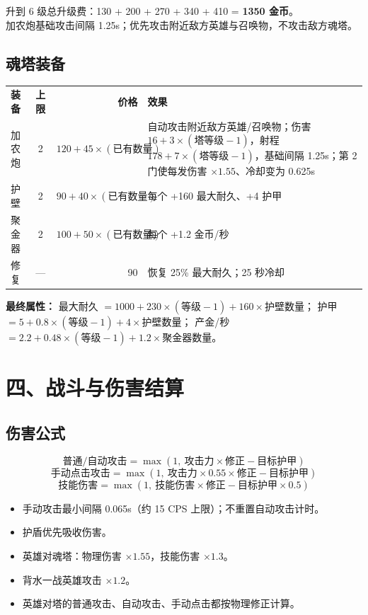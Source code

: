 \documentclass{ctexart}
\begin{document}
\vspace{2pt}
{\footnotesize
升到 6 级总升级费：130 + 200 + 270 + 340 + 410 = \textbf{1350 金币}。\\
加农炮基础攻击间隔 1.25s；优先攻击附近敌方英雄与召唤物，不攻击敌方魂塔。
}

\subsection*{魂塔装备}

{\footnotesize
\begin{tabularx}{\textwidth}{@{}l c r X@{}}
\rowcolor{teal}\color{white}\bfseries 装备 & \color{white}\bfseries 上限 & \color{white}\bfseries 价格 & \color{white}\bfseries 效果 \\
加农炮 & 2 & $120 + 45\times(\text{已有数量})$ & 自动攻击附近敌方英雄/召唤物；伤害 $16 + 3\times(\text{塔等级}-1)$，射程 $178 + 7\times(\text{塔等级}-1)$，基础间隔 1.25s；第 2 门使每发伤害 $\times 1.55$、冷却变为 0.625s \\
护壁 & 2 & $90 + 40\times(\text{已有数量})$ & 每个 +160 最大耐久、+4 护甲 \\
聚金器 & 2 & $100 + 50\times(\text{已有数量})$ & 每个 +1.2 金币/秒 \\
修复 & — & 90 & 恢复 25\% 最大耐久；25 秒冷却 \\
\end{tabularx}
}

{\footnotesize
\textbf{最终属性：}\quad
最大耐久 $=1000+230\times(\text{等级}-1)+160\times\text{护壁数量}$；\quad
护甲 $=5+0.8\times(\text{等级}-1)+4\times\text{护壁数量}$；\quad
产金/秒 $=2.2+0.48\times(\text{等级}-1)+1.2\times\text{聚金器数量}$。
}

\newpage

\section*{四、战斗与伤害结算}

\subsection*{伤害公式}

\[
\text{普通/自动攻击} = \max(1,\ \text{攻击力}\times\text{修正} - \text{目标护甲})
\]
\[
\text{手动点击攻击} = \max(1,\ \text{攻击力}\times0.55\times\text{修正} - \text{目标护甲})
\]
\[
\text{技能伤害} = \max(1,\ \text{技能伤害}\times\text{修正} - \text{目标护甲}\times0.5)
\]

\begin{itemize}
\item 手动攻击最小间隔 0.065s（约 15 CPS 上限）；不重置自动攻击计时。
\item 护盾优先吸收伤害。
\item 英雄对魂塔：物理伤害 $\times1.55$，技能伤害 $\times1.3$。
\item 背水一战英雄攻击 $\times1.2$。
\item 英雄对塔的普通攻击、自动攻击、手动点击都按物理修正计算。
\end{itemize}
\end{document}

